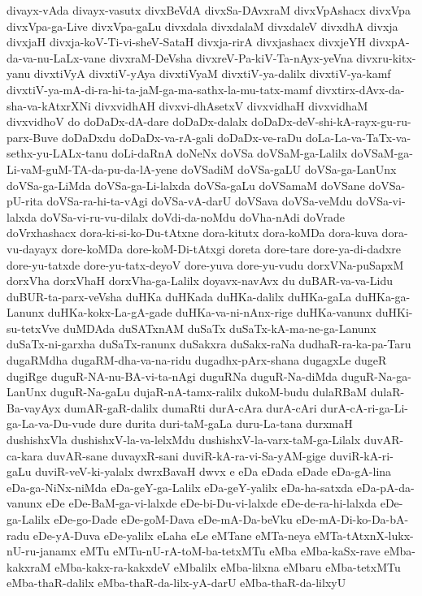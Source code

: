 {divayx-vAda
divayx-vasutx
divxBeVdA
divxSa-DAvxraM
divxVpAshacx
divxVpa
divxVpa-ga-Live
divxVpa-gaLu
divxdala
divxdalaM
divxdaleV
divxdhA
divxja
divxjaH
divxja-koV-Ti-vi-sheV-SataH
divxja-rirA
divxjashacx
divxjeYH
divxpA-da-va-nu-LaLx-vane
divxraM-DeVsha
divxreV-Pa-kiV-Ta-nAyx-yeVna
divxru-kitx-yanu
divxtiVyA
divxtiV-yAya
divxtiVyaM
divxtiV-ya-dalilx
divxtiV-ya-kamf
divxtiV-ya-mA-di-ra-hi-ta-jaM-ga-ma-sathx-la-mu-tatx-mamf
divxtirx-dAvx-da-sha-va-kAtxrXNi
divxvidhAH
divxvi-dhAsetxV
divxvidhaH
divxvidhaM
divxvidhoV
do
doDaDx-dA-dare
doDaDx-dalalx
doDaDx-deV-shi-kA-rayx-gu-ru-parx-Buve
doDaDxdu
doDaDx-va-rA-gali
doDaDx-ve-raDu
doLa-La-va-TaTx-va-sethx-yu-LALx-tanu
doLi-daRnA
doNeNx
doVSa
doVSaM-ga-Lalilx
doVSaM-ga-Li-vaM-guM-TA-da-pu-da-lA-yene
doVSadiM
doVSa-gaLU
doVSa-ga-LanUnx
doVSa-ga-LiMda
doVSa-ga-Li-lalxda
doVSa-gaLu
doVSamaM
doVSane
doVSa-pU-rita
doVSa-ra-hi-ta-vAgi
doVSa-vA-darU
doVSava
doVSa-veMdu
doVSa-vi-lalxda
doVSa-vi-ru-vu-dilalx
doVdi-da-noMdu
doVha-nAdi
doVrade
doVrxhashacx
dora-ki-si-ko-Du-tAtxne
dora-kitutx
dora-koMDa
dora-kuva
dora-vu-dayayx
dore-koMDa
dore-koM-Di-tAtxgi
doreta
dore-tare
dore-ya-di-dadxre
dore-yu-tatxde
dore-yu-tatx-deyoV
dore-yuva
dore-yu-vudu
dorxVNa-puSapxM
dorxVha
dorxVhaH
dorxVha-ga-Lalilx
doyavx-navAvx
du
duBAR-va-va-Lidu
duBUR-ta-parx-veVsha
duHKa
duHKada
duHKa-dalilx
duHKa-gaLa
duHKa-ga-Lanunx
duHKa-kokx-La-gA-gade
duHKa-va-ni-nAnx-rige
duHKa-vanunx
duHKi-su-tetxVve
duMDAda
duSATxnAM
duSaTx
duSaTx-kA-ma-ne-ga-Lanunx
duSaTx-ni-garxha
duSaTx-ranunx
duSakxra
duSakx-raNa
dudhaR-ra-ka-pa-Taru
dugaRMdha
dugaRM-dha-va-na-ridu
dugadhx-pArx-shana
dugagxLe
dugeR
dugiRge
duguR-NA-nu-BA-vi-ta-nAgi
duguRNa
duguR-Na-diMda
duguR-Na-ga-LanUnx
duguR-Na-gaLu
dujaR-nA-tamx-ralilx
dukoM-budu
dulaRBaM
dulaR-Ba-vayAyx
dumAR-gaR-dalilx
dumaRti
durA-cAra
durA-cAri
durA-cA-ri-ga-Li-ga-La-va-Du-vude
dure
durita
duri-taM-gaLa
duru-La-tana
durxmaH
dushishxVla
dushishxV-la-va-lelxMdu
dushishxV-la-varx-taM-ga-Lilalx
duvAR-ca-kara
duvAR-sane
duvayxR-sani
duviR-kA-ra-vi-Sa-yAM-gige
duviR-kA-ri-gaLu
duviR-veV-ki-yalalx
dwrxBavaH
dwvx
e
eDa
eDada
eDade
eDa-gA-lina
eDa-ga-NiNx-niMda
eDa-geY-ga-Lalilx
eDa-geY-yalilx
eDa-ha-satxda
eDa-pA-da-vanunx
eDe
eDe-BaM-ga-vi-lalxde
eDe-bi-Du-vi-lalxde
eDe-de-ra-hi-lalxda
eDe-ga-Lalilx
eDe-go-Dade
eDe-goM-Dava
eDe-mA-Da-beVku
eDe-mA-Di-ko-Da-bA-radu
eDe-yA-Duva
eDe-yalilx
eLaha
eLe
eMTane
eMTa-neya
eMTa-tAtxnX-lukx-nU-ru-janamx
eMTu
eMTu-nU-rA-toM-ba-tetxMTu
eMba
eMba-kaSx-rave
eMba-kakxraM
eMba-kakx-ra-kakxdeV
eMbalilx
eMba-lilxna
eMbaru
eMba-tetxMTu
eMba-thaR-dalilx
eMba-thaR-da-lilx-yA-darU
eMba-thaR-da-lilxyU
}
